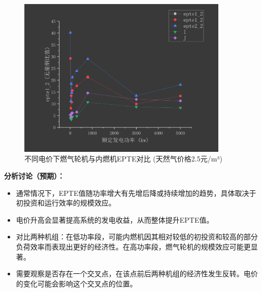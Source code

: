 \documentclass[12pt]{ctexart}
\begin{document}
\begin{figure}[H]
  \centering
  \includegraphics[width=0.9\textwidth]{fig/内燃机和汽轮机epte对比.png} %
  
  \caption{不同电价下燃气轮机与内燃机EPTE对比 (天然气价格2.5元/m³)}
  \label{fig:epte_elec_price}
\end{figure}

\textbf{分析讨论（预期）：}
\begin{itemize}
    \item 通常情况下，EPTE值随功率增大有先增后降或持续增加的趋势，具体取决于初投资和运行效率的规模效应。
    \item 电价升高会显著提高系统的发电收益，从而整体提升EPTE值。
    \item 对比两种机组：在低功率段，可能内燃机因其相对较低的初投资和较高的部分负荷效率而表现出更好的经济性。在高功率段，燃气轮机的规模效应可能更显著。
    \item 需要观察是否存在一个交叉点，在该点前后两种机组的经济性发生反转。电价的变化可能会影响这个交叉点的位置。
\end{itemize}
\end{document}
